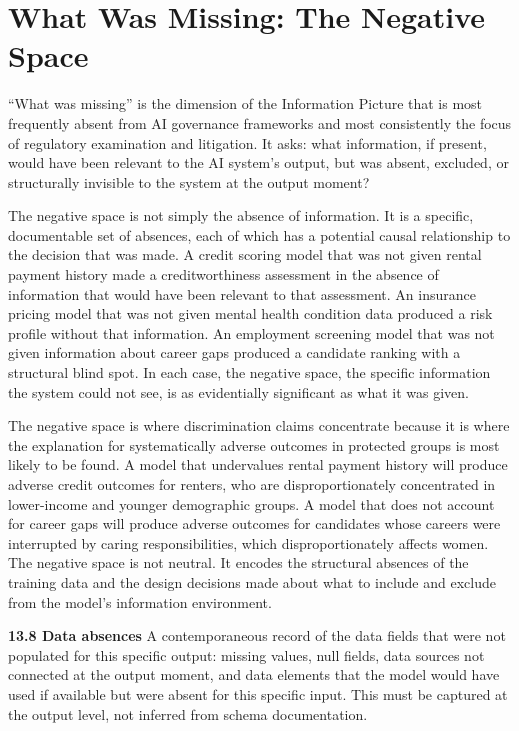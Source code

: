 \scenebreak

\section{What Was Missing: The Negative Space}

``What was missing'' is the dimension of the Information Picture that is most frequently absent from AI governance frameworks and most consistently the focus of regulatory examination and litigation. It asks: what information, if present, would have been relevant to the AI system's output, but was absent, excluded, or structurally invisible to the system at the output moment?

The negative space is not simply the absence of information. It is a specific, documentable set of absences, each of which has a potential causal relationship to the decision that was made. A credit scoring model that was not given rental payment history made a creditworthiness assessment in the absence of information that would have been relevant to that assessment. An insurance pricing model that was not given mental health condition data produced a risk profile without that information. An employment screening model that was not given information about career gaps produced a candidate ranking with a structural blind spot. In each case, the negative space, the specific information the system could not see, is as evidentially significant as what it was given.

The negative space is where discrimination claims concentrate because it is where the explanation for systematically adverse outcomes in protected groups is most likely to be found. A model that undervalues rental payment history will produce adverse credit outcomes for renters, who are disproportionately concentrated in lower-income and younger demographic groups. A model that does not account for career gaps will produce adverse outcomes for candidates whose careers were interrupted by caring responsibilities, which disproportionately affects women. The negative space is not neutral. It encodes the structural absences of the training data and the design decisions made about what to include and exclude from the model's information environment.

\textbf{13.8 Data absences} A contemporaneous record of the data fields that were not populated for this specific output: missing values, null fields, data sources not connected at the output moment, and data elements that the model would have used if available but were absent for this specific input. This must be captured at the output level, not inferred from schema documentation.

